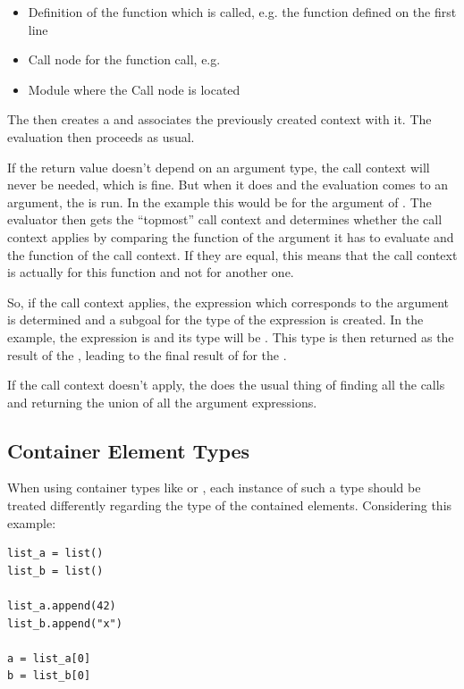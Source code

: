\documentclass[12pt,halfparskip,DIV11,BCOR10mm]{scrreprt}
\begin{document}
\begin{itemize}
	\item Definition of the function which is called, e.g. the  function defined on the first line
	\item Call node for the function call, e.g. 
	\item Module where the Call node is located
\end{itemize}

The  then creates a  and associates the previously created context with it. The evaluation then proceeds as usual.

If the return value doesn't depend on an argument type, the call context will never be needed, which is fine. But when it does and the evaluation comes to an argument, the  is run. In the example this would be for the  argument of . The evaluator then gets the ``topmost'' call context and determines whether the call context applies by comparing the function of the argument it has to evaluate and the function of the call context. If they are equal, this means that the call context is actually for this function and not for another one.

So, if the call context applies, the expression which corresponds to the argument is determined and a subgoal for the type of the expression is created. In the example, the expression is  and its type will be . This type is then returned as the result of the , leading to the final result of  for the .

If the call context doesn't apply, the  does the usual thing of finding all the calls and returning the union of all the argument expressions.


\subsection{Container Element Types}

When using container types like  or , each instance of such a type should be treated differently regarding the type of the contained elements. Considering this example:

\begin{lstlisting}
list_a = list()
list_b = list()

list_a.append(42)
list_b.append("x")

a = list_a[0]
b = list_b[0]
\end{lstlisting}
\end{document}
